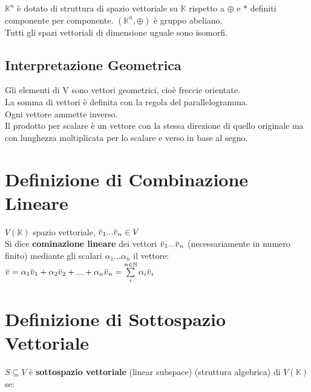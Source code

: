 \documentclass[a4paper, twoside, italian, 11pt]{book}
\newcommand{\overbar}[1] {\mkern 1.5mu\overline{\mkern-1.5mu#1\mkern-1.5mu}\mkern 1.5mu}
\newcommand{\N}{\mathbb N}
\newcommand{\K}{\mathbb K}
\begin{document}
\noindent
$\K^n$ è dotato di struttura di spazio vettoriale su $\K$ rispetto a $\oplus$ e $*$ definiti componente per componente. $(\K^n, \oplus)$ è gruppo abeliano. \\

\noindent
Tutti gli spazi vettoriali di dimensione uguale sono isomorfi.


\subsection{Interpretazione Geometrica}

Gli elementi di V sono vettori geometrici, cioè freccie orientate. \\
La somma di vettori è definita con la regola del parallelogramma. \\
Ogni vettore ammette inverso. \\
Il prodotto per scalare è un vettore con la stessa direzione di quello originale ma con lunghezza moltiplicata per lo scalare e verso in base al segno. \\





\section{Definizione di Combinazione Lineare}

$V(\K)$ spazio vettoriale, $\overbar v_1 ... \overbar v_n \in V$ \\

\noindent
Si dice \textbf{cominazione lineare} dei vettori $\overbar v_1 ... \overbar v_n$ (necessariamente in numero finito) mediante gli scalari $\alpha_1 ... \alpha_n$ il vettore: \\

$\overbar v = \alpha_1 \overbar v_1 + \alpha_2 \overbar v_2 + ... + \alpha_n \overbar v_n = \sum\limits_i^{n \in \N} \alpha_i \overbar v_i$



\section{Definizione di Sottospazio Vettoriale}

$S \subseteq V$ è \textbf{sottospazio vettoriale} (linear subspace) (struttura algebrica) di $V(\K)$ se: \\
\end{document}
